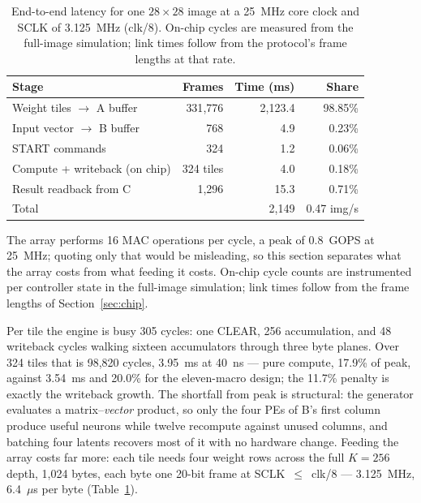 \documentclass[conference,a4paper]{APSIPA2026}
\begin{document}
\begin{table}[!ht]
\caption{End-to-end latency for one $28\times28$ image at a 25~MHz core clock and SCLK of 3.125~MHz (clk/8). On-chip cycles are measured from the full-image simulation; link times follow from the protocol's frame lengths at that rate.}
\label{tab:latency}
\centering
\renewcommand{\arraystretch}{1.0}
\begin{tabular}{@{}lrrr@{}}
\toprule
Stage & Frames & Time (ms) & Share \\
\midrule
Weight tiles $\rightarrow$ A buffer & 331{,}776 & 2{,}123.4 & 98.85\% \\
Input vector $\rightarrow$ B buffer & 768       & 4.9       & 0.23\% \\
START commands                      & 324       & 1.2       & 0.06\% \\
Compute + writeback (on chip)       & 324 tiles & 4.0       & 0.18\% \\
Result readback from C              & 1{,}296   & 15.3      & 0.71\% \\
\midrule
Total                               &           & 2{,}149   & 0.47 img/s \\
\bottomrule
\end{tabular}
\end{table}
The array performs 16 MAC operations per cycle, a peak of 0.8~GOPS at 25~MHz; quoting only that would be misleading, so this section separates what the array costs from what feeding it costs. On-chip cycle counts are instrumented per controller state in the full-image simulation; link times follow from the frame lengths of Section~\ref{sec:chip}.

Per tile the engine is busy 305 cycles: one CLEAR, 256 accumulation, and 48 writeback cycles walking sixteen accumulators through three byte planes. Over 324 tiles that is 98{,}820 cycles, 3.95~ms at 40~ns --- pure compute, 17.9\% of peak, against 3.54~ms and 20.0\% for the eleven-macro design; the 11.7\% penalty is exactly the writeback growth. The shortfall from peak is structural: the generator evaluates a matrix--\emph{vector} product, so only the four PEs of B's first column produce useful neurons while twelve recompute against unused columns, and batching four latents recovers most of it with no hardware change. Feeding the array costs far more: each tile needs four weight rows across the full $K=256$ depth, 1{,}024 bytes, each byte one 20-bit frame at SCLK~$\leq$~clk/8 --- 3.125~MHz, 6.4~$\mu$s per byte (Table~\ref{tab:latency}).
\end{document}
